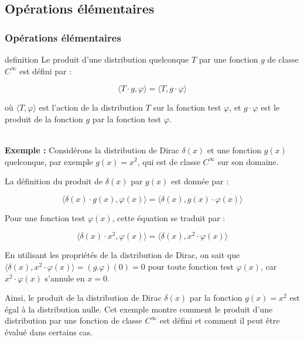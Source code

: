 \documentclass{beamer}
\begin{document}
\subsection{Opérations élémentaires}
\begin{frame}
\frametitle{Opérations élémentaires}

\begin{block}{definition}
Le produit d'une distribution quelconque \( T \) par une fonction \( g \) de classe \( C^{\infty} \) est défini par :

\[
\langle T \cdot g, \varphi \rangle = \langle T, g \cdot \varphi \rangle
\]

où \( \langle T, \varphi \rangle \) est l'action de la distribution \( T \) sur la fonction test \( \varphi \), et \( g \cdot \varphi \) est le produit de la fonction \( g \) par la fonction test \( \varphi \).

\end{block}
\\
\textbf{Exemple :}
Considérons la distribution de Dirac \( \delta(x) \) et une fonction \( g(x) \) quelconque, par exemple \( g(x) = x^2 \), qui est de classe \( C^{\infty} \) sur son domaine.

La définition du produit de \( \delta(x) \) par \( g(x) \) est donnée par :

\[
\langle \delta(x) \cdot g(x), \varphi(x) \rangle = \langle \delta(x), g(x) \cdot \varphi(x) \rangle
\]
\end{frame}
\begin{frame}
Pour une fonction test \( \varphi(x) \), cette équation se traduit par :

\[
\langle \delta(x) \cdot x^2, \varphi(x) \rangle = \langle \delta(x), x^2 \cdot \varphi(x) \rangle
\]

En utilisant les propriétés de la distribution de Dirac, on sait que \( \langle \delta(x), x^2 \cdot \varphi(x) \rangle = (g.\varphi)(0) = 0 \) pour toute fonction test \( \varphi(x) \), car \( x^2 \cdot \varphi(x) \) s'annule en \( x = 0 \).

Ainsi, le produit de la distribution de Dirac \( \delta(x) \) par la fonction \( g(x) = x^2 \) est égal à la distribution nulle. Cet exemple montre comment le produit d'une distribution par une fonction de classe \( C^{\infty} \) est défini et comment il peut être évalué dans certains cas.
\end{frame}
\end{document}
